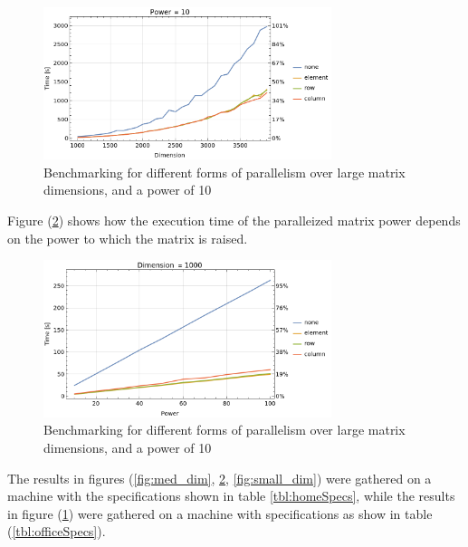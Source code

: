 \documentclass{article}
\begin{document}
    \begin{figure}[h]
        \centering
        \includegraphics[width=0.75\textwidth]{images/big_dim.png}
        \caption{Benchmarking for different forms of parallelism over large matrix dimensions, and a power of 10}
        \label{fig:big_dim}
    \end{figure}

    Figure (\ref{fig:power}) shows how the execution time of the paralleized matrix power depends on the power to which the matrix is raised.

    \begin{figure}[h]
        \centering
        \includegraphics[width=0.75\textwidth]{images/power.png}
        \caption{Benchmarking for different forms of parallelism over large matrix dimensions, and a power of 10}
        \label{fig:power}
    \end{figure}

    The results in figures (\ref{fig:med_dim}, \ref{fig:power}, \ref{fig:small_dim}) were gathered on a machine with the specifications shown in table \ref{tbl:homeSpecs}, while the results in figure (\ref{fig:big_dim}) were gathered on a machine with specifications as show in table (\ref{tbl:officeSpecs}). 
\end{document}
